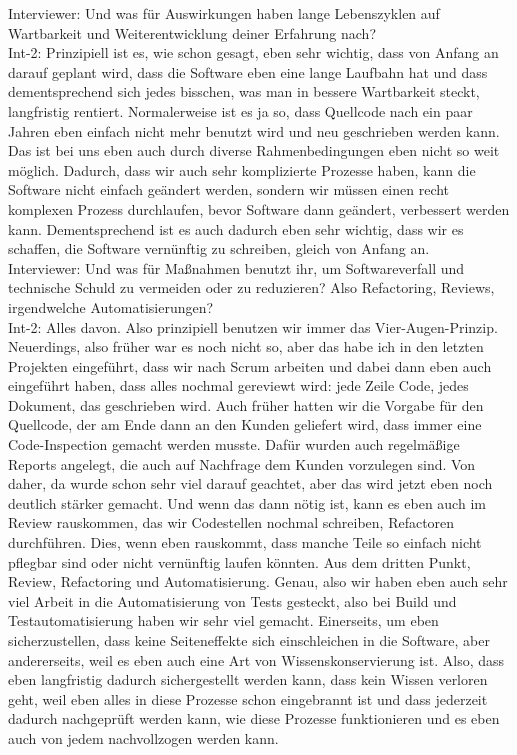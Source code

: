 Interviewer: Und was für Auswirkungen haben lange Lebenszyklen auf Wartbarkeit und Weiterentwicklung deiner Erfahrung nach?\\
Int-2: Prinzipiell ist es, wie schon gesagt, eben sehr wichtig, dass von Anfang an darauf geplant wird, dass die Software eben eine lange Laufbahn hat und dass dementsprechend sich jedes bisschen, was man in bessere Wartbarkeit steckt, langfristig rentiert. Normalerweise ist es ja so, dass Quellcode nach ein paar Jahren eben einfach nicht mehr benutzt wird und neu geschrieben werden kann. Das ist bei uns eben auch durch diverse Rahmenbedingungen eben nicht so weit möglich. Dadurch, dass wir auch sehr komplizierte Prozesse haben, kann die Software nicht einfach geändert werden, sondern wir müssen einen recht komplexen Prozess durchlaufen, bevor Software dann geändert, verbessert werden kann. Dementsprechend ist es auch dadurch eben sehr wichtig, dass wir es schaffen, die Software vernünftig zu schreiben, gleich von Anfang an.\\
Interviewer: Und was für Maßnahmen benutzt ihr, um Softwareverfall und technische Schuld zu vermeiden oder zu reduzieren? Also Refactoring, Reviews, irgendwelche Automatisierungen? \\
Int-2: Alles davon. Also prinzipiell benutzen wir immer das Vier-Augen-Prinzip. Neuerdings, also früher war es noch nicht so, aber das habe ich in den letzten Projekten eingeführt, dass wir nach Scrum arbeiten und dabei dann eben auch eingeführt haben, dass alles nochmal gereviewt wird: jede Zeile Code, jedes Dokument, das geschrieben wird. Auch früher hatten wir die Vorgabe für den Quellcode, der am Ende dann an den Kunden geliefert wird, dass immer eine Code-Inspection gemacht werden musste. Dafür wurden auch regelmäßige Reports angelegt, die auch auf Nachfrage dem Kunden vorzulegen sind. Von daher, da wurde schon sehr viel darauf geachtet, aber das wird jetzt eben noch deutlich stärker gemacht. Und wenn das dann nötig ist, kann es eben auch im Review rauskommen, das wir Codestellen nochmal schreiben, Refactoren durchführen. Dies, wenn eben rauskommt, dass manche Teile so einfach nicht pflegbar sind oder nicht vernünftig laufen könnten. Aus dem dritten Punkt, Review, Refactoring und Automatisierung. Genau, also wir haben eben auch sehr viel Arbeit in die Automatisierung von Tests gesteckt, also bei Build und Testautomatisierung haben wir sehr viel gemacht. Einerseits, um eben sicherzustellen, dass keine Seiteneffekte sich einschleichen in die Software, aber andererseits, weil es eben auch eine Art von Wissenskonservierung ist. Also, dass eben langfristig dadurch sichergestellt werden kann, dass kein Wissen verloren geht, weil eben alles in diese Prozesse schon eingebrannt ist und dass jederzeit dadurch nachgeprüft werden kann, wie diese Prozesse funktionieren und es eben auch von jedem nachvollzogen werden kann. \\
